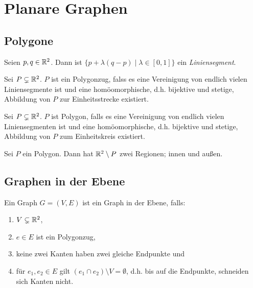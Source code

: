 \chapter{Planare Graphen}

\section{Polygone}

\begin{definition}[Liniensegment]
    Seien $ p, q \in \mathbb{R}^2 $.
    Dann ist $ \{ p + \lambda (q - p) \mid \lambda \in [0, 1] \} $ ein \textit{Liniensegment}.
\end{definition}

\begin{definition}[Polygonzug]
    Sei $ P \subsetneq \mathbb{R}^2 $.
    $ P $ ist ein Polygonzug, falss es eine Vereinigung von endlich vielen Liniensegmente ist und eine homöomorphische, d.h. bijektive und stetige, Abbildung von $ P $ zur Einheitsstrecke existiert.
\end{definition}

\begin{definition}[Polygon]
    Sei $ P \subsetneq \mathbb{R}^2 $.
    $ P $ ist Polygon, falls es eine Vereinigung von endlich vielen Liniensegmenten ist und eine homöomorphische, d.h. bijektive und stetige, Abbildung von $ P $ zum Einheitskreis existiert.
\end{definition}

\begin{theorem}
    Sei $ P $ ein Polygon.
    Dann hat $ \mathbb{R}^2 \setminus P $ zwei Regionen; innen und außen.
\end{theorem}

\section{Graphen in der Ebene}

\begin{definition}
    Ein Graph $ G = (V, E) $ ist ein Graph in der Ebene, falls:
    \begin{enumerate}
        \item $ V \subsetneq \mathbb{R}^2 $,
        \item $ e \in E $ ist ein Polygonzug,
        \item keine zwei Kanten haben zwei gleiche Endpunkte und
        \item für $ e_1, e_2 \in E $ gilt $ (e_1 \cap e_2) \setminus V = \emptyset $, d.h. bis auf die Endpunkte, schneiden sich Kanten nicht.
    \end{enumerate}
\end{definition}

